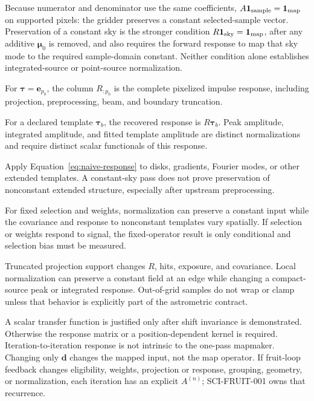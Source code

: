 \documentclass[11pt]{article}
\begin{document}
\begin{description}[style=nextline]
\item[Constant sky.]
Because numerator and denominator use the same coefficients,
\(A\boldsymbol1_{\rm sample}=\boldsymbol1_{\rm map}\) on supported pixels:
the gridder preserves a constant selected-sample vector. Preservation of a
constant sky is the stronger condition
\(R\boldsymbol1_{\rm sky}=\boldsymbol1_{\rm map}\), after any additive
\(\boldsymbol\mu_0\) is removed, and also requires the forward response to map
that sky mode to the required sample-domain constant. Neither condition alone
establishes integrated-source or point-source normalization.
\item[Delta or basis-pixel input.]
For \(\boldsymbol\tau=\boldsymbol e_{p_0}\), the column
\(R_{:p_0}\) is the complete pixelized impulse response, including projection,
preprocessing, beam, and boundary truncation.
\item[Beam/template source.]
For a declared template \(\boldsymbol\tau_b\), the recovered response is
\(R\boldsymbol\tau_b\). Peak amplitude, integrated amplitude, and fitted
template amplitude are distinct normalizations and require distinct scalar
functionals of this response.
\item[Resolved and extended modes.]
Apply Equation~\eqref{eq:naive-response} to disks, gradients, Fourier modes, or
other extended templates. A constant-sky pass does not prove preservation of
nonconstant extended structure, especially after upstream preprocessing.
\item[Variable coverage.]
For fixed selection and weights, normalization can preserve a constant input
while the covariance and response to nonconstant templates vary spatially. If
selection or weights respond to signal, the fixed-operator result is only
conditional and selection bias must be measured.
\item[Boundaries.]
Truncated projection support changes \(R\), hits, exposure, and covariance.
Local normalization can preserve a constant field at an edge while changing a
compact-source peak or integrated response. Out-of-grid samples do not wrap or
clamp unless that behavior is explicitly part of the astrometric contract.
\end{description}

A scalar transfer function is justified only after shift invariance is
demonstrated. Otherwise the response matrix or a position-dependent kernel is
required. Iteration-to-iteration response is not intrinsic to the one-pass
mapmaker. Changing only \(\boldsymbol d\) changes the mapped input, not the map
operator. If fruit-loop feedback changes eligibility, weights, projection or
response, grouping, geometry, or normalization, each iteration has an explicit
\(A^{(n)}\); SCI-FRUIT-001 owns that recurrence.
\end{document}
